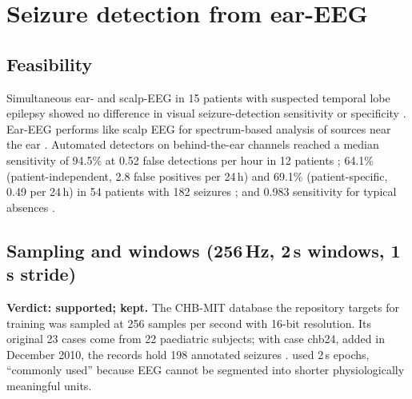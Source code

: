 \documentclass[10pt,a4paper]{article}
\begin{document}
\section{Seizure detection from ear-EEG}\label{sec:detect}

\subsection{Feasibility}
Simultaneous ear- and scalp-EEG in 15 patients with suspected temporal lobe epilepsy showed no difference in visual
seizure-detection sensitivity or specificity \parencite{zibrandtsen2017}. Ear-EEG performs like scalp EEG for
spectrum-based analysis of sources near the ear \parencite{mikkelsen2015}. Automated detectors on behind-the-ear channels
reached a median sensitivity of 94.5\% at 0.52 false detections per hour in 12 patients \parencite{gu2018}; 64.1\%
(patient-independent, 2.8 false positives per 24\,h) and 69.1\% (patient-specific, 0.49 per 24\,h) in 54 patients with
182 seizures \parencite{vandecasteele2020}; and 0.983 sensitivity for typical absences \parencite{swinnen2021}.

\subsection{Sampling and windows (256\,Hz, 2\,s windows, 1\,s stride)}
\textbf{Verdict: supported; kept.} The CHB-MIT database the repository targets for training was sampled at 256 samples
per second with 16-bit resolution. Its original 23 cases come from 22 paediatric subjects; with case chb24, added in
December 2010, the records hold 198 annotated seizures \parencite{chbmit2010,goldberger2000}. \textcite{shoeb2010} used 2\,s epochs, ``commonly used'' because EEG cannot be
segmented into shorter physiologically meaningful units.
\end{document}
